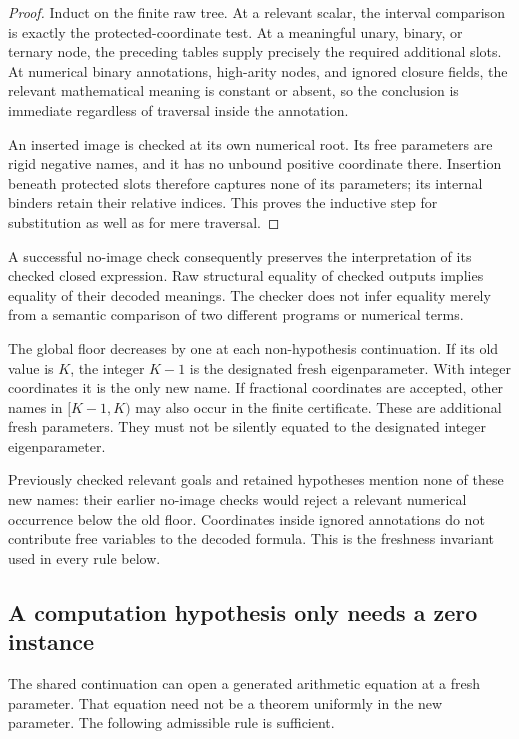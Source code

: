 \documentclass[11pt,letterpaper]{article}
\theoremstyle{definition}\newtheorem{definition}[theorem]{Definition}
\theoremstyle{remark}\newtheorem{remark}[theorem]{Remark}
\begin{document}
\begin{proof}
Induct on the finite raw tree.  At a relevant scalar, the interval
comparison is exactly the protected-coordinate test.  At a meaningful
unary, binary, or ternary node, the preceding tables supply precisely
the required additional slots.  At numerical binary annotations,
high-arity nodes, and ignored closure fields, the relevant mathematical
meaning is constant or absent, so the conclusion is immediate
regardless of traversal inside the annotation.

An inserted image is checked at its own numerical root.  Its free
parameters are rigid negative names, and it has no unbound positive
coordinate there.  Insertion beneath protected slots therefore captures
none of its parameters; its internal binders retain their relative
indices.  This proves the inductive step for substitution as well as
for mere traversal.
\end{proof}

A successful no-image check consequently preserves the interpretation
of its checked closed expression.  Raw structural equality of checked
outputs implies equality of their decoded meanings.  The checker does
not infer equality merely from a semantic comparison of two different
programs or numerical terms.

The global floor decreases by one at each non-hypothesis continuation.
If its old value is $K$, the integer $K-1$ is the designated fresh
eigenparameter.  With integer coordinates it is the only new name.
If fractional coordinates are accepted, other names in $[K-1,K)$ may
also occur in the finite certificate.  These are additional fresh
parameters.  They must not be silently equated to the designated
integer eigenparameter.

Previously checked relevant goals and retained hypotheses mention none
of these new names: their earlier no-image checks would reject a
relevant numerical occurrence below the old floor.  Coordinates inside
ignored annotations do not contribute free variables to the decoded
formula.  This is the freshness invariant used in every rule below.

\subsection{A computation hypothesis only needs a zero instance}
\label{subsec:zero-supply}

The shared continuation can open a generated arithmetic equation at a
fresh parameter.  That equation need not be a theorem uniformly in the
new parameter.  The following admissible rule is sufficient.
\end{document}

